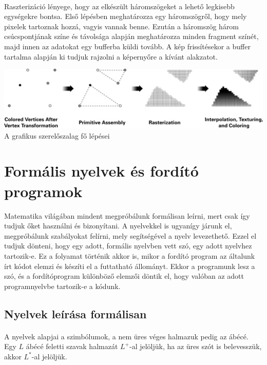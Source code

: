 \documentclass{elteikthesis}
\begin{document}
\paragraph{}
Raszterizáció lényege, hogy az elkészült háromszögeket a lehető legkisebb egységekre bontsa. Első lépésben meghatározza egy háromszögről, hogy mely pixelek tartoznak hozzá, vagyis vannak benne. Ezután a háromszög három csúcspontjának színe és távolsága alapján meghatározza minden fragment színét, majd innen az adatokat egy bufferba küldi tovább. A kép frissítésekor a buffer tartalma alapján ki tudjuk rajzolni a képernyőre a kívánt alakzatot.
\begin{center}
\includegraphics[width=15cm]{pics/graphic_pipeline}\\
{\footnotesize A grafikus szerelőszalag fő lépései}
\end{center}

\newpage
\section{Formális nyelvek és fordító programok}
Matematika világában mindent megpróbálunk formálisan leírni, mert csak így tudjuk őket használni és bizonyítani. A nyelvekkel is ugyanígy járunk el, megpróbálunk szabályokat felírni, mely segítségével a nyelv levezethető. Ezzel el tudjuk dönteni, hogy egy adott, formális nyelvben vett szó, egy adott nyelvhez tartozik-e. Ez a folyamat történik akkor is, mikor a fordító program az általunk írt kódot elemzi és készíti el a futtatható állományt. Ekkor a programunk lesz a szó, és a fordítóprogram különböző elemzői döntik el, hogy valóban az adott programnyelvbe tartozik-e a kódunk.
\subsection{Nyelvek leírása formálisan}
\paragraph{}
A nyelvek alapjai a szimbólumok, a nem üres véges halmazuk pedig az ábécé. Egy $L$ ábécé feletti szavak halmazát $L^+$-al jelöljük, ha az üres szót is belevesszük, akkor $L^*$-al jelöljük.
\end{document}
